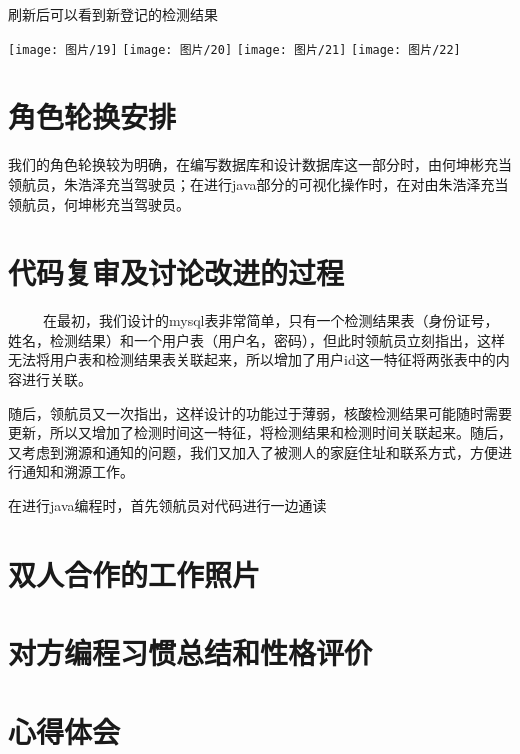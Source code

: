 \documentclass{article}
\begin{document}
刷新后可以看到新登记的检测结果

\begin{center}
\texttt{[image: 图片/19]}
\texttt{[image: 图片/20]}
\texttt{[image: 图片/21]}
\texttt{[image: 图片/22]}
\end{center}
\section{角色轮换安排}
我们的角色轮换较为明确，在编写数据库和设计数据库这一部分时，由何坤彬充当领航员，朱浩泽充当驾驶员；在进行java部分的可视化操作时，在对由朱浩泽充当领航员，何坤彬充当驾驶员。
\section{代码复审及讨论改进的过程}
\ \ \ \ \ 在最初，我们设计的mysql表非常简单，只有一个检测结果表（身份证号，姓名，检测结果）和一个用户表（用户名，密码），但此时领航员立刻指出，这样无法将用户表和检测结果表关联起来，所以增加了用户id这一特征将两张表中的内容进行关联。

随后，领航员又一次指出，这样设计的功能过于薄弱，核酸检测结果可能随时需要更新，所以又增加了检测时间这一特征，将检测结果和检测时间关联起来。随后，又考虑到溯源和通知的问题，我们又加入了被测人的家庭住址和联系方式，方便进行通知和溯源工作。

在进行java编程时，首先领航员对代码进行一边通读
\section{双人合作的工作照片}
\section{对方编程习惯总结和性格评价}
\section{心得体会}
\end{document}
